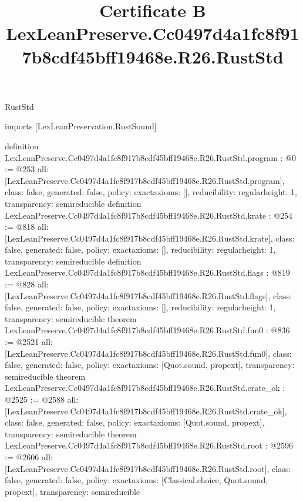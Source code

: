 \begin{lexlean}{RustStd}
\title{Certificate B LexLeanPreserve.Cc0497d4a1fc8f917b8cdf45bff19468e.R26.RustStd}
\begin{coremodule}
imports [LexLeanPreservation.RustSound]

definition LexLeanPreserve.Cc0497d4a1fc8f917b8cdf45bff19468e.R26.RustStd.program : @0 := @253 {
  all: [LexLeanPreserve.Cc0497d4a1fc8f917b8cdf45bff19468e.R26.RustStd.program],
  class: false,
  generated: false,
  policy: exact{axioms: []},
  reducibility: regular{height: 1},
  transparency: semireducible
}
definition LexLeanPreserve.Cc0497d4a1fc8f917b8cdf45bff19468e.R26.RustStd.krate : @254 := @818 {
  all: [LexLeanPreserve.Cc0497d4a1fc8f917b8cdf45bff19468e.R26.RustStd.krate],
  class: false,
  generated: false,
  policy: exact{axioms: []},
  reducibility: regular{height: 1},
  transparency: semireducible
}
definition LexLeanPreserve.Cc0497d4a1fc8f917b8cdf45bff19468e.R26.RustStd.flags : @819 := @828 {
  all: [LexLeanPreserve.Cc0497d4a1fc8f917b8cdf45bff19468e.R26.RustStd.flags],
  class: false,
  generated: false,
  policy: exact{axioms: []},
  reducibility: regular{height: 1},
  transparency: semireducible
}
theorem LexLeanPreserve.Cc0497d4a1fc8f917b8cdf45bff19468e.R26.RustStd.fun0 : @836 := @2521 {
  all: [LexLeanPreserve.Cc0497d4a1fc8f917b8cdf45bff19468e.R26.RustStd.fun0],
  class: false,
  generated: false,
  policy: exact{axioms: [Quot.sound, propext]},
  transparency: semireducible
}
theorem LexLeanPreserve.Cc0497d4a1fc8f917b8cdf45bff19468e.R26.RustStd.crate_ok : @2525 := @2588 {
  all: [LexLeanPreserve.Cc0497d4a1fc8f917b8cdf45bff19468e.R26.RustStd.crate_ok],
  class: false,
  generated: false,
  policy: exact{axioms: [Quot.sound, propext]},
  transparency: semireducible
}
theorem LexLeanPreserve.Cc0497d4a1fc8f917b8cdf45bff19468e.R26.RustStd.root : @2596 := @2606 {
  all: [LexLeanPreserve.Cc0497d4a1fc8f917b8cdf45bff19468e.R26.RustStd.root],
  class: false,
  generated: false,
  policy: exact{axioms: [Classical.choice, Quot.sound, propext]},
  transparency: semireducible
}


\end{coremodule}
\end{lexlean}

